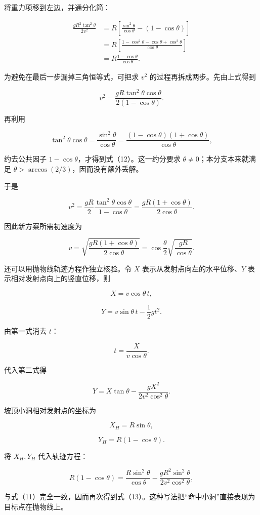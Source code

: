 \documentclass[12pt,a4paper,UTF8]{ctexart}
\begin{document}
将重力项移到左边，并通分化简：

\[\begin{aligned}
\frac{gR^2\tan^2\theta}{2v^2}
&=R\left[\frac{\sin^2\theta}{\cos\theta}-(1-\cos\theta)\right]\\
&=R\left[\frac{1-\cos^2\theta-\cos\theta+\cos^2\theta}
{\cos\theta}\right]\\
&=R\frac{1-\cos\theta}{\cos\theta}.
\end{aligned}\]

为避免在最后一步漏掉三角恒等式，可把求 \(v^2\)
的过程再拆成两步。先由上式得到

\[v^2=\frac{gR\tan^2\theta\cos\theta}{2(1-\cos\theta)}.\]

再利用

\[\tan^2\theta\cos\theta
=\frac{\sin^2\theta}{\cos\theta}
=\frac{(1-\cos\theta)(1+\cos\theta)}{\cos\theta},\]

约去公共因子 \(1-\cos\theta\)，才得到式（12）。这一约分要求
\(\theta\ne0\)；本分支本来就满足
\(\theta>\arccos(2/3)\)，因而没有额外丢解。

于是

\[v^2
=\frac{gR}{2}\frac{\tan^2\theta\cos\theta}{1-\cos\theta}
=\frac{gR(1+\cos\theta)}{2\cos\theta}. \tag{12}\]

因此新方案所需初速度为

\[\boxed{v=\sqrt{\frac{gR(1+\cos\theta)}{2\cos\theta}}
=\cos\frac\theta2\sqrt{\frac{gR}{\cos\theta}}}. \tag{13}\]

还可以用抛物线轨迹方程作独立核验。令 \(X\)
表示从发射点向左的水平位移、\(Y\) 表示相对发射点向上的竖直位移，则

\[X=v\cos\theta\,t,\]

\[Y=v\sin\theta\,t-\frac12gt^2.\]

由第一式消去 \(t\)：

\[t=\frac{X}{v\cos\theta}.\]

代入第二式得

\[Y=X\tan\theta-
\frac{gX^2}{2v^2\cos^2\theta}.\]

坡顶小洞相对发射点的坐标为

\[X_H=R\sin\theta,\]

\[Y_H=R(1-\cos\theta).\]

将 \(X_H,Y_H\) 代入轨迹方程：

\[R(1-\cos\theta)
=\frac{R\sin^2\theta}{\cos\theta}
-\frac{gR^2\sin^2\theta}{2v^2\cos^2\theta},\]

与式（11）完全一致，因而再次得到式（13）。这种写法把``命中小洞''直接表现为目标点在抛物线上。
\end{document}
